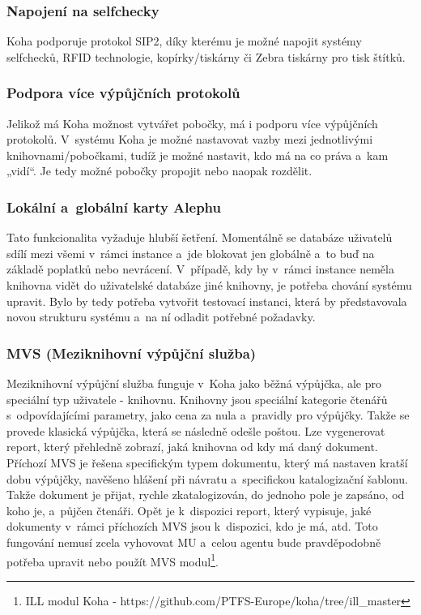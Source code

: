 \documentclass[
	11pt, oneside, printed, final, palatino, monochrome
	microtype,
	table,   %
	lof,     %
	lot     %
]{fithesis3}
\begin{document}
{\subsubsection{Napojení na selfchecky}
Koha podporuje protokol SIP2, díky kterému je možné napojit systémy selfchecků, RFID technologie, kopírky/tiskárny či Zebra tiskárny pro tisk štítků.%

\subsubsection{Podpora více výpůjčních protokolů}
Jelikož má Koha možnost vytvářet pobočky, má i podporu více výpůjčních protokolů. V~systému Koha je možné nastavovat vazby mezi jednotlivými knihovnami/pobočkami, tudíž je možné nastavit, kdo má na co práva a~kam „vidí“. Je tedy možné pobočky propojit nebo naopak rozdělit.

\subsubsection{Lokální a~globální karty Alephu}
Tato funkcionalita vyžaduje hlubší šetření. Momentálně se databáze uživatelů sdílí mezi všemi v~rámci instance a~jde blokovat jen globálně a~to buď na základě poplatků nebo nevrácení. V~případě, kdy by v~rámci instance neměla knihovna vidět do uživatelské databáze jiné knihovny, je potřeba chování systému upravit. Bylo by tedy potřeba vytvořit testovací instanci, která by představovala novou strukturu systému a~na ní odladit potřebné požadavky.

\subsubsection{MVS (Meziknihovní výpůjční služba)}
Meziknihovní výpůjční služba funguje v~Koha jako běžná výpůjčka, ale pro speciální typ uživatele - knihovnu. Knihovny jsou speciální kategorie čtenářů s~odpovídajícími parametry, jako cena za nula a~pravidly pro výpůjčky. Takže se provede klasická výpůjčka, která se následně odešle poštou. Lze vygenerovat report, který přehledně zobrazí, jaká knihovna od kdy má daný dokument. Příchozí MVS je řešena specifickým typem dokumentu, který má nastaven kratší dobu výpůjčky, navěšeno hlášení při návratu a~specifickou katalogizační šablonu. Takže dokument je přijat, rychle zkatalogizován, do jednoho pole je zapsáno, od koho je, a~půjčen čtenáři. Opět je k~dispozici report, který vypisuje, jaké dokumenty v~rámci příchozích MVS jsou k~dispozici, kdo je má, atd. Toto fungování nemusí zcela vyhovovat MU a~celou agentu bude pravděpodobně potřeba upravit nebo použít MVS modul\footnote{ILL modul Koha - https://github.com/PTFS-Europe/koha/tree/ill\_master}.

}
\end{document}
